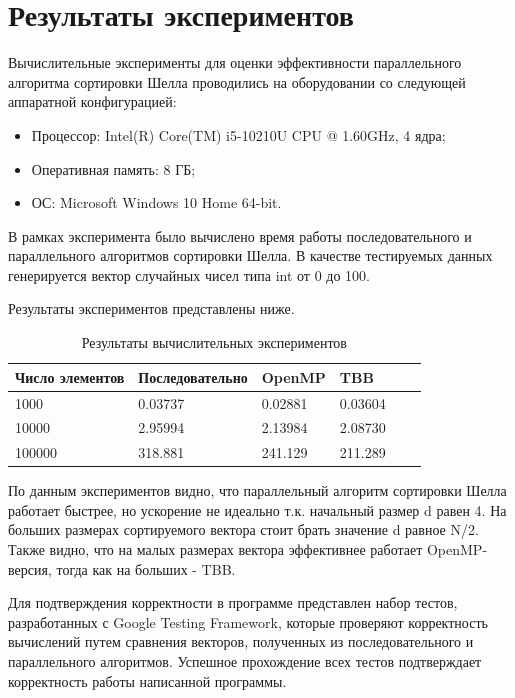 \documentclass{report}
\begin{document}
\newpage

\section*{Результаты экспериментов}
Вычислительные эксперименты для оценки эффективности параллельного алгоритма сортировки Шелла проводились на оборудовании со следующей аппаратной конфигурацией:

\begin{itemize}
\item Процессор: Intel(R) Core(TM) i5-10210U CPU @ 1.60GHz, 4 ядра;
\item Оперативная память: 8 ГБ;
\item ОС: Microsoft Windows 10 Home 64-bit.
\end{itemize}

В рамках эксперимента было вычислено время работы последовательного и параллельного алгоритмов сортировки Шелла.
В качестве тестируемых данных генерируется вектор случайных чисел типа int от 0 до 100.

Результаты экспериментов представлены ниже.
\begin{table}[!h]
\centering
\begin{tabular}{ | l | l | l | l  | l | l | }
\hline
Число элементов  & Последовательно & OpenMP & TBB  \\ \hline
1000  & 0.03737 & 0.02881 &  0.03604 \\ \hline
10000  & 2.95994 & 2.13984 &  2.08730 \\ \hline
100000  & 318.881 & 241.129 &  211.289 \\ \hline
\end{tabular}
\caption{Результаты вычислительных экспериментов}
\end{table}

По данным экспериментов видно, что параллельный алгоритм сортировки Шелла работает быстрее, но ускорение не идеально т.к. начальный размер d равен 4. На больших размерах сортируемого вектора стоит брать значение d равное N/2. Также видно, что на малых размерах вектора эффективнее работает OpenMP-версия, тогда как на больших - TBB.

Для подтверждения корректности в программе представлен набор тестов, разработанных с Google Testing Framework, которые проверяют корректность вычислений путем сравнения векторов, полученных из последовательного и параллельного алгоритмов. Успешное прохождение всех тестов подтверждает корректность работы написанной программы.
\end{document}

